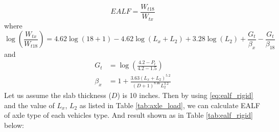 \begin{equation*}
EALF = \frac{W_{t18}}{W_{tx}}
\end{equation*}
where
\begin{equation}
\log\left(\frac{W_{tx}}{W_{t18}}\right) = 4.62 \log(18 + 1) - 4.62 \log(L_x + L_2) + 3.28 \log(L_2) + \frac{G_t}{\beta_x} - \frac{G_t}{\beta_{18}}
\label{eq:ealf_rigid}
\end{equation}
and
\begin{align*}
G_t &= \log\left(\frac{4.2 - P_t}{4.2 - 1.5}\right) \\
\beta_x &= 1 + \frac{3.63(L_x + L_2)^{5.2}}{(D + 1)^{8.46} L_2^{3.2}}
\end{align*}
Let us assume the slab thickness ($D$) is 10 inches. Then by using \ref{eq:ealf_rigid} and the value of $L_x$, $L_2$ as listed in Table \ref{tab:axle_load}, we can calculate EALF of axle type of each vehicles type. And result shown as in Table \ref{tab:ealf_rigid} below:
